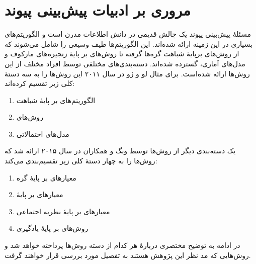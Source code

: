 \section{مروری بر ادبیات پیش‌بینی پیوند}


مسئله‌ٔ پیش‌بینی پیوند یک چالش قدیمی در دانش اطلاعات مدرن است و الگوریتم‌های بسیاری در این زمینه ارائه شده‌اند. این الگوریتم‌ها طیف وسیعی را شامل می‌شوند که از روش‌های برپایهٔ شباهت گره‌ها گرفته تا روش‌های بر پایهٔ زنجیره‌های مارکوف و مدل‌های آماری، گسترده شده‌اند. دسته‌بندی‌های مختلفی توسط افراد مختلف از این روش‌ها ارائه شده‌است. برای مثال لو و ژو\cite{lu2011link} در سال ۲۰۱۱ این روش‌ها را به سه دستهٔ کلی زیر تقسیم کرده‌اند:
\begin{enumerate}
  \item الگوریتم‌های بر پایهٔ شباهت %
  \item روش‌های \MaximumLikelihood{} %
  \item مدل‌های احتمالاتی
\end{enumerate}

یک دسته‌بندی دیگر از روش‌ها توسط ونگ و همکاران\cite{wang2015link} در سال ۲۰۱۵ ارائه شد که روش‌ها را به چهار دستهٔ کلی زیر تقسیم‌بندی می‌کند:
\begin{enumerate}
  \item معیارهای بر پایهٔ گره
  \item معیارهای بر پایهٔ \Topology{}
  \item معیارهای بر پایهٔ نظریه اجتماعی
  \item روش‌های بر پایهٔ یادگیری
\end{enumerate}

در ادامه به توضیح مختصری دربارهٔ هر کدام از دسته روش‌ها پرداخته خواهد شد و روش‌هایی که مد نظر این پژوهش هستند به تفصیل مورد بررسی قرار خواهند گرفت.


